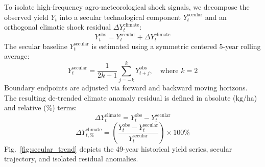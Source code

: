 \documentclass[conference]{IEEEtran}
\begin{document}
To isolate high-frequency agro-meteorological shock signals, we decompose the observed yield $Y_t$ into a secular technological component $Y_t^{\text{secular}}$ and an orthogonal climatic shock residual $\Delta Y_t^{\text{climate}}$:
\begin{equation}
Y_t^{\text{obs}} = Y_t^{\text{secular}} + \Delta Y_t^{\text{climate}}
\label{eq:detrend}
\end{equation}
The secular baseline $Y_t^{\text{secular}}$ is estimated using a symmetric centered 5-year rolling average:
\begin{equation}
Y_t^{\text{secular}} = \frac{1}{2k + 1} \sum_{j=-k}^{k} Y_{t+j}^{\text{obs}}, \quad \text{where } k = 2
\label{eq:ma5}
\end{equation}
Boundary endpoints are adjusted via forward and backward moving horizons. The resulting de-trended climate anomaly residual is defined in absolute ($\text{kg/ha}$) and relative (\%) terms:
\begin{equation}
\Delta Y_t^{\text{climate}} = Y_t^{\text{obs}} - Y_t^{\text{secular}}
\end{equation}
\begin{equation}
\Delta Y_{t, \%}^{\text{climate}} = \left(\frac{Y_t^{\text{obs}} - Y_t^{\text{secular}}}{Y_t^{\text{secular}}}\right) \times 100\%
\end{equation}
Fig.~\ref{fig:secular_trend} depicts the 49-year historical yield series, secular trajectory, and isolated residual anomalies.
\end{document}
